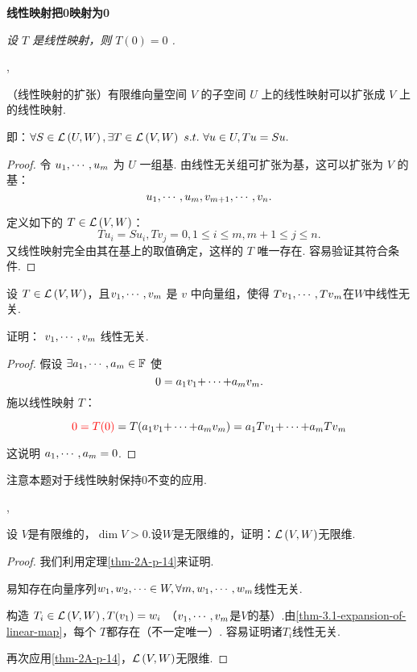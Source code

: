 \documentclass[cn,hazy,blue,14pt,screen]{elegantnote}
\begin{document}
\Sep

\begin{theorem}
    \normalfont \textbf{线性映射把0映射为0}

    \itshape 设 $T$ 是线性映射，则 $T(0)=0$ .
\end{theorem}

\sep

\begin{theorem}
    \label{thm-3.1-expansion-of-linear-map}
    （线性映射的扩张）有限维向量空间 $V$ 的子空间  $U$ 上的线性映射可以扩张成 $V$ 上的线性映射.

    即：$\forall S\in\lm{U}{W},\exists T\in\lm{V}{W} \ s.t.\ \forall u\in U, Tu=Su.$

    \begin{proof}
        令 $\veclist[m]{u}$ 为 $U$ 一组基. 由线性无关组可扩张为基，这可以扩张为 $V$ 的基： 
        $$\veclist[m]{u},v_{m+1},\cdots,v_n.$$

        定义如下的 $T\in \lm{V}{W}$：
        $$
        Tu_i=Su_i,Tv_j=0,1\leqslant i\leqslant m,m+1\leqslant j\leqslant n.
        $$
        又线性映射完全由其在基上的取值确定，这样的 $T$ 唯一存在. 容易验证其符合条件.
    \end{proof}
\end{theorem}

\Sep

\begin{problem}
    设 $T\in \lm{V}{W} $，且$\veclist[m]{v}$ 是 $v$ 中向量组，使得 $\veclist[m]{Tv}$在$W$中线性无关.

    证明： $\veclist[m]{v}$ 线性无关.
\end{problem}

\begin{proof}
    假设 $\exists \numlist[m]{a} \in \fs$ 使
    $$
    0=\svecsum[m]{a}{v}.
    $$
    施以线性映射 $T$：

    $$
    {\color{red}0=T(0)}=T(\svecsum{a}{v})=\svecsum[m]{a}{Tv}
    $$

    这说明 $\numlist[m]{a} = 0$.
\end{proof}

\begin{note}
    注意本题对于线性映射保持0不变的应用.
\end{note}

\sep

\begin{problem}
    设 $V$是有限维的，$\dim V>0$.设$W$是无限维的，证明：$\lm{V}{W}$无限维.
\end{problem}

\begin{proof}
    我们利用定理\ref{thm-2A-p-14}来证明.

    易知存在向量序列$w_1,w_2,\cdots\in W,\forall m, \veclist[m]{w}$线性无关.

    构造 $T_i \in\lm{V}{W}, T(v_1) = w_i$ （$\veclist[m]{v}$是$V$的基）.由\ref{thm-3.1-expansion-of-linear-map}，每个 $T$都存在（不一定唯一）. 容易证明诸$T_i$线性无关.

    再次应用\ref{thm-2A-p-14}，$\lm{V}{W}$无限维.
\end{proof}
\end{document}
